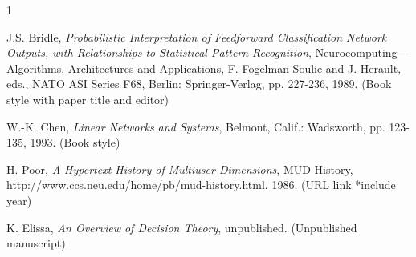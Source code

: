 \documentclass[10pt,journal,compsoc]{IEEEtran}
\begin{document}

%
%
%

\newpage
\begin{thebibliography}{1}

J.S. Bridle, \emph{Probabilistic Interpretation of Feedforward Classification Network Outputs, with Relationships to Statistical Pattern Recognition}, Neurocomputing—Algorithms, Architectures and Applications, F. Fogelman-Soulie and J. Herault, eds., NATO ASI Series F68, Berlin: Springer-Verlag, pp. 227-236, 1989. (Book style with paper title and editor)

W.-K. Chen, \emph{Linear Networks and Systems}, Belmont, Calif.: Wadsworth, pp. 123-135, 1993. (Book style)

H. Poor, \emph{A Hypertext History of Multiuser Dimensions}, MUD History, http://www.ccs.neu.edu/home/pb/mud-history.html. 1986. (URL link *include year)

K. Elissa, \emph{An Overview of Decision Theory}, unpublished. (Unpublished manuscript)

\end{thebibliography}

\end{document}
